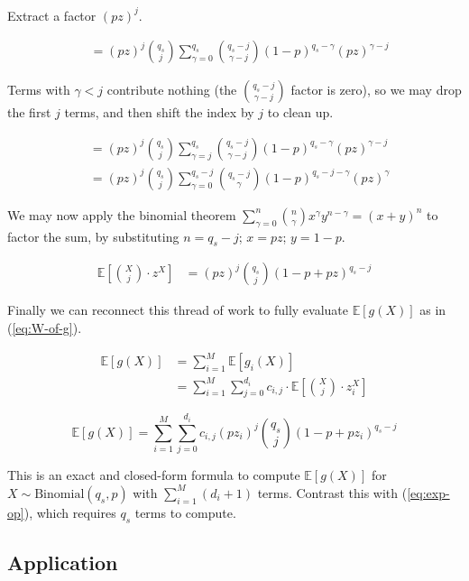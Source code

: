 \documentclass[11pt]{article}
\begin{document}
Extract a factor $(pz)^j$.

\begin{align}
  &= (pz)^j \binom{q_s}{j} \sum_{\gamma=0}^{q_s} \binom{q_s - j}{\gamma - j} (1 - p)^{q_s - \gamma} (pz)^{\gamma - j}
\end{align}

Terms with $\gamma < j$ contribute nothing (the $\binom{q_s - j}{\gamma - j}$ factor is zero), so we may drop the first $j$ terms, and then shift the index by $j$ to clean up.

\begin{align}
    &= (pz)^j \binom{q_s}{j} \sum_{\gamma=j}^{q_s} \binom{q_s - j}{\gamma - j} (1 - p)^{q_s - \gamma} (pz)^{\gamma - j} \\
    &= (pz)^j \binom{q_s}{j} \sum_{\gamma=0}^{q_s - j} \binom{q_s - j}{\gamma} (1 - p)^{q_s - j - \gamma} (pz)^{\gamma}
\end{align}

We may now apply the binomial theorem $\sum_{\gamma=0}^n \binom{n}{\gamma} x^\gamma y^{n - \gamma} = (x + y)^n$ to factor the sum, by substituting $n = q_s - j$; $x = pz$; $y = 1 - p$.

\begin{align}
  \mathbb E \left[ \binom{X}{j} \cdot z^X \right]
    &= (pz)^j \binom{q_s}{j} \left(1 - p + pz \right)^{q_s - j}
\end{align}

Finally we can reconnect this thread of work to fully evaluate $\mathbb E[g(X)]$ as in (\ref{eq:W-of-g}).

\begin{align}
  \mathbb E[g(X)]
    &= \sum_{i = 1}^M \mathbb E[g_i(X)] \\
    &= \sum_{i = 1}^M \sum_{j=0}^{d_i} c_{i, j} \cdot \mathbb E \left[ \binom{X}{j} \cdot z_i^X \right]
\end{align}

\begin{equation}
\label{eq:generalization}
  \boxed{
    \mathbb E[g(X)] = \sum_{i = 1}^M \sum_{j=0}^{d_i} c_{i, j} (p z_i)^j \binom{q_s}{j} \left(1 - p + p z_i \right)^{q_s - j}
  }
\end{equation}

This is an exact and closed-form formula to compute $\mathbb E [g(X)]$ for $X \sim \mathrm{Binomial}(q_s, p)$ with $\sum_{i=1}^M (d_i + 1)$ terms. Contrast this with (\ref{eq:exp-op}), which requires $q_s$ terms to compute.

\subsection{Application}
\end{document}
